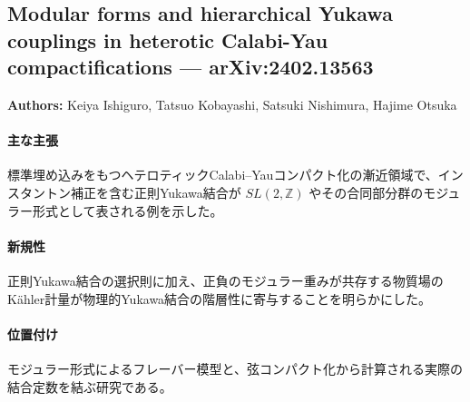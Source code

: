 \subsection{Modular forms and hierarchical Yukawa couplings in heterotic Calabi-Yau compactifications --- arXiv:2402.13563}

\textbf{Authors:} Keiya Ishiguro, Tatsuo Kobayashi, Satsuki Nishimura, Hajime Otsuka

\paragraph{主な主張}
標準埋め込みをもつヘテロティックCalabi--Yauコンパクト化の漸近領域で、インスタントン補正を含む正則Yukawa結合が $SL(2,\mathbb{Z})$ やその合同部分群のモジュラー形式として表される例を示した\cite{Ishiguro:2024xph}。

\paragraph{新規性}
正則Yukawa結合の選択則に加え、正負のモジュラー重みが共存する物質場のK\"ahler計量が物理的Yukawa結合の階層性に寄与することを明らかにした。

\paragraph{位置付け}
モジュラー形式によるフレーバー模型と、弦コンパクト化から計算される実際の結合定数を結ぶ研究である。
